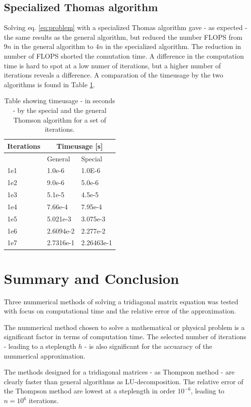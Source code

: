 \documentclass[twoside,twocolumn]{article}
\newcommand{\nl}{

\medskip
\noindent
}
\begin{document}
\subsection{Specialized Thomas algorithm}
Solving eq. \ref{eq:problem} with a specialized Thomas algorithm gave - as expected - the same results as the general algorithm, but reduced the number FLOPS from $9n$ in the general algorithm to $4n$ in the specialized algorithm. The reduction in number of FLOPS shorted the comutation time. A difference in the computation time is hard to spot at a low numer of iterations, but a higher number of iterations reveals a difference. A comparation of the timeusage by the two algorithms is found in Table \ref{tbl:ThompsonTime}.


\begin{table}[htp]
\centering
\begin{tabular}{|l|l|l|} \hline
Iterations & \multicolumn{2}{|c|}{Timeusage [s]}\\ \hline
 	& General 	& Special\\ \hline
1e1	& 1.0e-6	& 1.0E-6\\
1e2 & 9.0e-6	& 5.0e-6\\
1e3 & 5.1e-5	& 4.5e-5\\
1e4 & 7.66e-4	& 7.95e-4\\
1e5 & 5.021e-3	& 3.075e-3\\
1e6 & 2.6094e-2	&2.277e-2\\
1e7 & 2.7316e-1	& 2.26463e-1 \\ \hline
\end{tabular}
\caption{Table showing timeusage - in seconds - by the special and the general Thomson algorithm for a set of iterations.} \label{tbl:ThompsonTime}
\end{table}

\newpage
\section{Summary and Conclusion}
Three nummerical methods of solving a tridiagonal matrix equation was tested with focus on computational time and the relative error of the approximation.\nl

The nummerical method chosen to solve a mathematical or physical problem is a significant factor in terms of computation time. The selected number of iterations - leading to a steplength $h$ - is also significant for the accuaracy of the nummerical approximation.\nl

The methods designed for a tridiagonal matrices - as Thompson method - are clearly faster than general algorithms as LU-decomposition. The relative error of the Thompson method are lowest at a steplength in order $10^{-6}$, leading to $n=10^6$ iterations.


\twocolumn[{%
{}

}]
\end{document}
